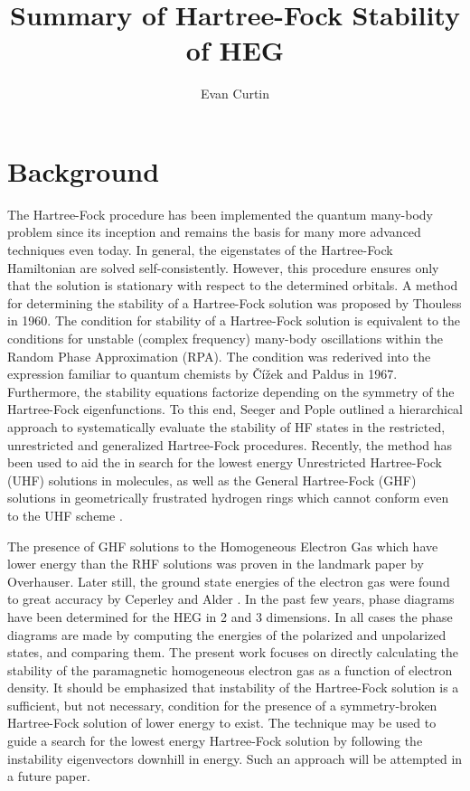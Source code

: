 \documentclass{revtex4}
\begin{document}
\title{Summary of Hartree-Fock Stability of HEG}
\author{Evan Curtin}
\maketitle


\section{Background}
    The Hartree-Fock procedure has been implemented the quantum many-body problem since its inception and remains the basis for many more advanced techniques even today. In general, the eigenstates of the Hartree-Fock Hamiltonian are solved self-consistently. However, this procedure ensures only that the solution is stationary with respect to the determined orbitals. A method for determining the stability of a Hartree-Fock solution was proposed by Thouless in 1960\cite{Thouless1960}. The condition for stability of a Hartree-Fock solution is equivalent to the conditions for unstable (complex frequency) many-body oscillations within the Random Phase Approximation (RPA). The condition was rederived into the expression familiar to quantum chemists by Čížek and Paldus in 1967\cite{Cizek1967}. Furthermore, the stability equations factorize depending on the symmetry of the Hartree-Fock eigenfunctions. To this end, Seeger and Pople outlined a hierarchical approach to systematically evaluate the stability of HF states in the restricted, unrestricted and generalized Hartree-Fock procedures\cite{Seeger1977}. Recently, the method has been used to aid the in search for the lowest energy Unrestricted Hartree-Fock (UHF) solutions in molecules, as well as the General Hartree-Fock (GHF) solutions in geometrically frustrated hydrogen rings which cannot conform even to the UHF scheme \cite{Pulay2016}\cite{Goings2015}.
    
    The presence of GHF solutions to the Homogeneous Electron Gas which have lower energy than the RHF solutions was proven in the landmark paper by Overhauser\cite{Overhauser1962}. Later still, the ground state energies of the electron gas were found to great accuracy by Ceperley and Alder \cite{Ceperley1980}. In the past few years, phase diagrams have been determined for the HEG in 2 and 3 dimensions\cite{Delyon2008}\cite{Bernu2011}\cite{Baguet2013}. In all cases the phase diagrams are made by computing the energies of the polarized and unpolarized states, and comparing them. The present work focuses on directly calculating the stability of the paramagnetic homogeneous electron gas as a function of electron density. It should be emphasized that instability of the Hartree-Fock solution is a sufficient, but not necessary, condition for the presence of a symmetry-broken Hartree-Fock solution of lower energy to exist. The technique may be used to guide a search for the lowest energy Hartree-Fock solution by following the instability eigenvectors downhill in energy. Such an approach will be attempted in a future paper. 
    
\end{document}
